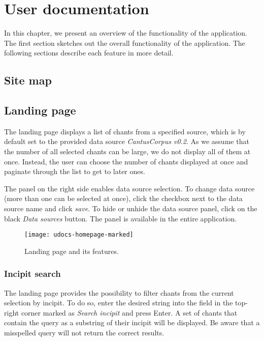 \chapter{User documentation}

In this chapter, we present an overview of the functionality of the application. The first section sketches out the overall
functionality of the application. The following sections describe each feature in more detail.

\section{Site map}

\section{Landing page}

The landing page displays a list of chants from a specified source, which is by default set to the provided data source \emph{CantusCorpus v0.2}.
As we assume that the number of all selected chants can be large, we do not display all of them at once. Instead, the user can choose the number of
chants displayed at once and paginate through the list to get to later ones.

The panel on the right side enables data source selection. To change data source (more than one can be selected at once), click the checkbox next
to the data source name and click \emph{save}. To hide or unhide the data source panel, click on the black \emph{Data sources} button. The panel
is available in the entire application.

\begin{figure}[h]
\centering
\texttt{[image: udocs-homepage-marked]}
\caption{Landing page and its features.}
\label{fig:land_page}
\end{figure}

\subsection{Incipit search}

The landing page provides the possibility to filter chants from the current selection by incipit. To do so, enter the desired string into
the field in the top-right corner marked as \emph{Search incipit} and press Enter. A set of chants that contain the query as a substring of their incipit will be displayed.
Be aware that a misspelled query will not return the correct results.

